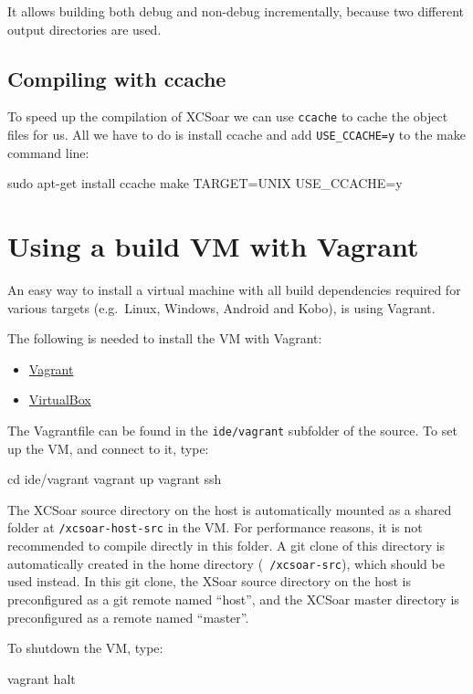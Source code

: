 It allows building both debug and non-debug incrementally, because two
different output directories are used.

\subsection{Compiling with ccache}

To speed up the compilation of XCSoar we can use \texttt{ccache} to cache the 
object files for us. All we have to do is install ccache and 
add 
\texttt{USE\_CCACHE=y} 
to the make command line:

\begin{verbatim*}
sudo apt-get install ccache
make TARGET=UNIX USE_CCACHE=y
\end{verbatim*}

\section{Using a build VM with Vagrant}\label{sec:vagrant}
An easy way to install a virtual machine with all build dependencies required
for various targets (e.g.\ Linux, Windows, Android and Kobo), is using Vagrant.

The following is needed to install the VM with Vagrant:

\begin{itemize}
\item \href{https://www.vagrantup.com/}{Vagrant}
\item \href{https://www.virtualbox.org/}{VirtualBox}
\end{itemize}

The Vagrantfile can be found in the \texttt{ide/vagrant} subfolder of the \xc
source. To set up the VM, and connect to it, type:

\begin{verbatim*}
cd ide/vagrant
vagrant up
vagrant ssh
\end{verbatim*}

The XCSoar source directory on the host is automatically mounted as a shared
folder at \texttt{/xcsoar-host-src} in the VM. For performance reasons, it is
not recommended to compile directly in this folder. A git clone of this
directory is automatically created in the home directory
(\texttt{~/xcsoar-src}), which should be used instead. In this git clone, the
XSoar source directory on the host is preconfigured as a git remote named
``host'', and the XCSoar master directory is preconfigured as a remote named
``master''.

To shutdown the VM, type:

\begin{verbatim*}
vagrant halt
\end{verbatim*}
